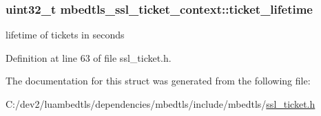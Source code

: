 \hypertarget{structmbedtls__ssl__ticket__context_ae2548112f1ab8d5ceb7752a205ce358c}{
\subsubsection[{ticket\-\_\-lifetime}]{\setlength{\rightskip}{0pt plus 5cm}uint32\-\_\-t mbedtls\-\_\-ssl\-\_\-ticket\-\_\-context\-::ticket\-\_\-lifetime}}\label{structmbedtls__ssl__ticket__context_ae2548112f1ab8d5ceb7752a205ce358c}
lifetime of tickets in seconds 

Definition at line 63 of file ssl\-\_\-ticket.\-h.



The documentation for this struct was generated from the following file\-:\begin{DoxyCompactItemize}
\item 
C\-:/dev2/luambedtls/dependencies/mbedtls/include/mbedtls/\hyperlink{ssl__ticket_8h}{ssl\-\_\-ticket.\-h}\end{DoxyCompactItemize}
